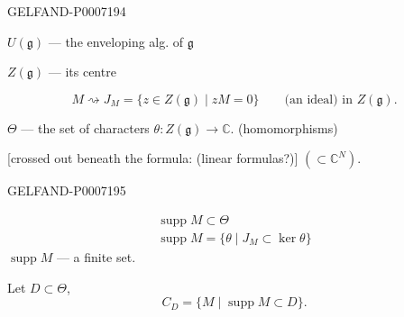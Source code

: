 \begin{GelfandAdjacentEvidence}{GELFAND-P000719}{4}


\(U(\mathfrak g)\) --- the enveloping alg. of \(\mathfrak g\)

\(Z(\mathfrak g)\) --- its centre

\[
M\rightsquigarrow J_M=\{z\in Z(\mathfrak g)\mid zM=0\}
\qquad\text{(an ideal) in }Z(\mathfrak g).
\]

\(\Theta\) --- the set of characters \(\theta:Z(\mathfrak g)\to\mathbb C\).
(homomorphisms)

[crossed out beneath the formula: (linear formulas?)] \((\subset\mathbb C^N)\).
\end{GelfandAdjacentEvidence}
\begin{GelfandAdjacentEvidence}{GELFAND-P000719}{5}

\end{GelfandAdjacentEvidence}


\begin{gather*}
\operatorname{supp}M\subset\Theta\\
\operatorname{supp}M=\{\theta\mid J_M\subset\ker\theta\}
\end{gather*}
\(\operatorname{supp}M\) --- a finite set.

Let \(D\subset\Theta\),
\[
C_D=\{M\mid\operatorname{supp}M\subset D\}.
\]


